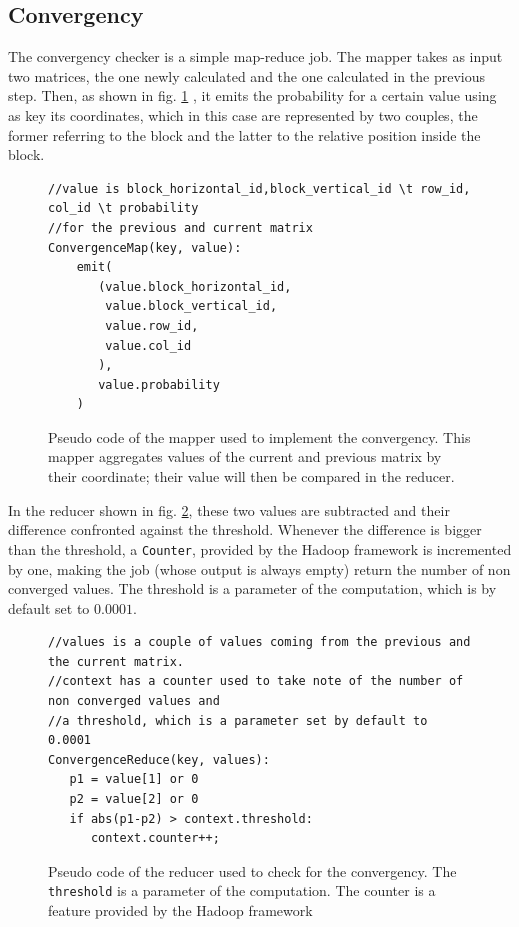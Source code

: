 \subsection{Convergency}
The convergency checker is a simple map-reduce job. The mapper takes as input two matrices, the one 
newly calculated and the one calculated in the previous step. 
Then, as shown in fig. \ref{fig:convergencyMap} , it emits the probability for a certain value using as key its coordinates, which
in this case are represented by two couples, the former referring to the block and the latter to the
relative position inside the block.
\begin{figure}[H]
\begin{verbatim}
//value is block_horizontal_id,block_vertical_id \t row_id, col_id \t probability
//for the previous and current matrix
ConvergenceMap(key, value):
    emit(
       (value.block_horizontal_id,
        value.block_vertical_id,
        value.row_id,
        value.col_id
       ),
       value.probability
    )
\end{verbatim}
\caption{Pseudo code of the mapper used to implement the convergency. This mapper aggregates values of the current and previous matrix
by their coordinate; their value will then be compared in the reducer.}
\label{fig:convergencyMap}
\end{figure}

In the reducer shown in fig. \ref{figure:convergencyReduce}, these two values are subtracted and their difference confronted against the threshold. Whenever the difference is bigger than the threshold, a \texttt{Counter}, provided by the Hadoop framework is incremented by one,
making the job (whose output is always empty) return the number of non converged values.
The threshold is a parameter of the computation, which is by default set to $0.0001$.

\begin{figure}[H]
\begin{verbatim}
//values is a couple of values coming from the previous and the current matrix. 
//context has a counter used to take note of the number of non converged values and
//a threshold, which is a parameter set by default to 0.0001
ConvergenceReduce(key, values):
   p1 = value[1] or 0
   p2 = value[2] or 0
   if abs(p1-p2) > context.threshold:
      context.counter++; 
\end{verbatim}
\caption{Pseudo code of the reducer used to check for the convergency. The \texttt{threshold} is a parameter of the computation. The counter is a feature provided by the Hadoop framework}
\label{figure:convergencyReduce}
\end{figure}

